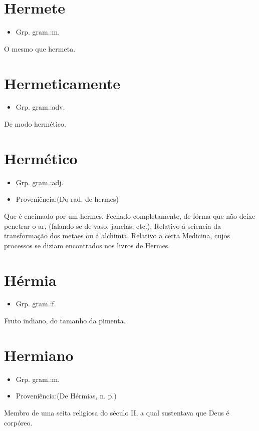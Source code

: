\documentclass{article}
\begin{document}
\section{Hermete}
\begin{itemize}
\item {Grp. gram.:m.}
\end{itemize}
O mesmo que \textunderscore hermeta\textunderscore .
\section{Hermeticamente}
\begin{itemize}
\item {Grp. gram.:adv.}
\end{itemize}
De modo hermético.
\section{Hermético}
\begin{itemize}
\item {Grp. gram.:adj.}
\end{itemize}
\begin{itemize}
\item {Proveniência:(Do rad. de \textunderscore hermes\textunderscore )}
\end{itemize}
Que é encimado por um hermes.
Fechado completamente, de fórma que não deixe penetrar o ar, (falando-se de vaso, janelas, etc.).
Relativo á sciencia da transformação dos metaes ou á alchimia.
Relativo a certa Medicina, cujos processos se diziam encontrados nos livros de Hermes.
\section{Hérmia}
\begin{itemize}
\item {Grp. gram.:f.}
\end{itemize}
Fruto indiano, do tamanho da pimenta.
\section{Hermiano}
\begin{itemize}
\item {Grp. gram.:m.}
\end{itemize}
\begin{itemize}
\item {Proveniência:(De \textunderscore Hérmias\textunderscore , n. p.)}
\end{itemize}
Membro de uma seita religiosa do século II, a qual sustentava que Deus é corpóreo.
\end{document}
